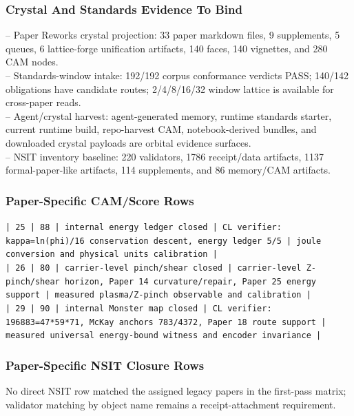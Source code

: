 \documentclass[11pt]{article}
\begin{document}
\subsubsection*{Crystal And Standards Evidence To Bind}

\noindent{}-- Paper Reworks crystal projection: 33 paper markdown files, 9 supplements, 5 queues, 6 lattice-forge unification artifacts, 140 faces, 140 vignettes, and 280 CAM nodes.\\
\noindent{}-- Standards-window intake: 192/192 corpus conformance verdicts PASS; 140/142 obligations have candidate routes; 2/4/8/16/32 window lattice is available for cross-paper reads.\\
\noindent{}-- Agent/crystal harvest: agent-generated memory, runtime standards starter, current runtime build, repo-harvest CAM, notebook-derived bundles, and downloaded crystal payloads are orbital evidence surfaces.\\
\noindent{}-- NSIT inventory baseline: 220 validators, 1786 receipt/data artifacts, 1137 formal-paper-like artifacts, 114 supplements, and 86 memory/CAM artifacts.\\

\subsubsection*{Paper-Specific CAM/Score Rows}

\noindent\texttt{| 25 | 88 | internal energy ledger closed | CL verifier: kappa=ln(phi)/16 conservation descent, energy ledger 5/5 | joule conversion and physical units calibration |}\\
\noindent\texttt{| 26 | 80 | carrier-level pinch/shear closed | carrier-level Z-pinch/shear horizon, Paper 14 curvature/repair, Paper 25 energy support | measured plasma/Z-pinch observable and calibration |}\\
\noindent\texttt{| 29 | 90 | internal Monster map closed | CL verifier: 196883=47*59*71, McKay anchors 783/4372, Paper 18 route support | measured universal energy-bound witness and encoder invariance |}\\

\subsubsection*{Paper-Specific NSIT Closure Rows}

No direct NSIT row matched the assigned legacy papers in the first-pass matrix; validator matching by object name remains a receipt-attachment requirement.
\end{document}
